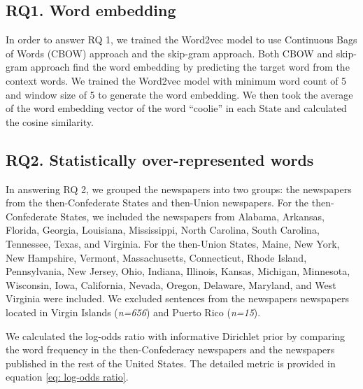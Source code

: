 \documentclass[11pt]{article}
\begin{document}
\subsection{RQ1. Word embedding} \label{sec:method_rq1_word_embedding}
In order to answer RQ 1, we trained the Word2vec model \cite{mikolov_distributed_2013} to
use Continuous Bags of Words (CBOW) approach and the skip-gram approach. Both CBOW and 
skip-gram approach find the word embedding by predicting the target word from the context words.
We trained the Word2vec model with minimum word count of 5 and window size of 5 to generate the word embedding. 
We then took the average of the word embedding vector of the word ``coolie'' in each State and calculated the cosine similarity.

\subsection{RQ2. Statistically over-represented words} \label{sec:method_rq2_overrepresented_words}
In answering RQ 2, we grouped the newspapers into two groups: the newspapers from the then-Confederate States and then-Union newspapers. 
For the then-Confederate States, we included the newspapers from Alabama, Arkansas, Florida, Georgia, Louisiana, Mississippi, 
North Carolina, South Carolina, Tennessee, Texas, and Virginia.
For the then-Union States, Maine, New York, New Hampshire, Vermont, Massachusetts, Connecticut, Rhode Island,
Pennsylvania, New Jersey, Ohio, Indiana, Illinois, Kansas, Michigan, Minnesota, Wisconsin, Iowa, California, Nevada, Oregon, Delaware, Maryland,
and West Virginia were included.
We excluded sentences from the newspapers newspapers located in Virgin Islands (\textit{n=656}) and Puerto Rico (\textit{n=15}).

We calculated the log-odds ratio with informative Dirichlet prior \cite{monroe2008fightin} 
by comparing the word frequency in the then-Confederacy newspapers 
and the newspapers published in the rest of the United States. 
The detailed metric is provided in equation \ref{eq: log-odds ratio}.
\end{document}
